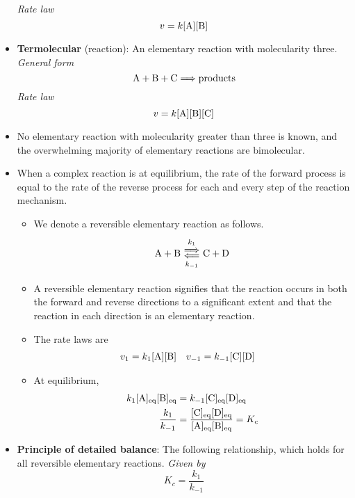 \documentclass[../notes.tex]{subfiles}
\begin{document}
\begin{itemize}
\begin{equation*}
    \end{equation*}
    \emph{Rate law}
    \begin{equation*}
        v = k[\ce{A}][\ce{B}]
    \end{equation*}
    \item \textbf{Termolecular} (reaction): An elementary reaction with molecularity three. \emph{General form}
    \begin{equation*}
        \ce{A}+\ce{B}+\ce{C} \Longrightarrow \text{products}
    \end{equation*}
    \emph{Rate law}
    \begin{equation*}
        v = k[\ce{A}][\ce{B}][\ce{C}]
    \end{equation*}
    \item No elementary reaction with molecularity greater than three is known, and the overwhelming majority of elementary reactions are bimolecular.
    \item When a complex reaction is at equilibrium, the rate of the forward process is equal to the rate of the reverse process for each and every step of the reaction mechanism.
    \begin{itemize}
        \item We denote a reversible elementary reaction as follows.
        \begin{equation*}
            \ce{A + B} \Longleftrightarrows[k_1][k_{-1}] \ce{C + D}
        \end{equation*}
        \item A reversible elementary reaction signifies that the reaction occurs in both the forward and reverse directions to a significant extent and that the reaction in each direction is an elementary reaction.
        \item The rate laws are
        \begin{align*}
            v_1 &= k_1[\ce{A}][\ce{B}]&
            v_{-1} &= k_{-1}[\ce{C}][\ce{D}]
        \end{align*}
        \item At equilibrium,
        \begin{align*}
            k_1[\ce{A}]_\text{eq}[\ce{B}]_\text{eq} &= k_{-1}[\ce{C}]_\text{eq}[\ce{D}]_\text{eq}\\
            \frac{k_1}{k_{-1}} &= \frac{[\ce{C}]_\text{eq}[\ce{D}]_\text{eq}}{[\ce{A}]_\text{eq}[\ce{B}]_\text{eq}} = K_c
        \end{align*}
    \end{itemize}
    \item \textbf{Principle of detailed balance}: The following relationship, which holds for all reversible elementary reactions. \emph{Given by}
    \begin{equation*}
        K_c = \frac{k_1}{k_{-1}}
    \end{equation*}
\end{itemize}
\end{document}
